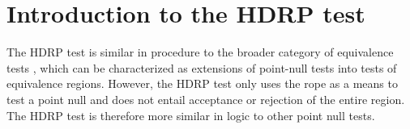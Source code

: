 \documentclass[man]{apa}
\newcommand{\hdr}{HDRP}
\begin{document}







  







\section*{Introduction to the \hdr{} test}

The \hdr{} test is similar in procedure to the broader category of equivalence tests \cite{RogersEtAl1993}, which can be characterized as extensions of point-null tests into tests of equivalence regions.
However, the \hdr{} test only uses the rope as a means to test a point null and does not entail acceptance or rejection of the entire region. The \hdr{} test is therefore more similar in logic to other point null tests.
\end{document}
